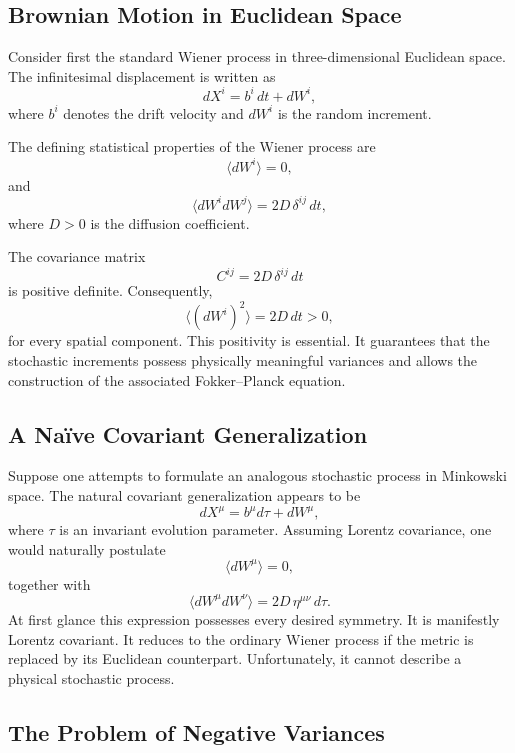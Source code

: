 \subsection{Brownian Motion in Euclidean Space}

Consider first the standard Wiener process in three-dimensional
Euclidean space.
The infinitesimal displacement is written as
\[dX^i=b^i\,dt+dW^i ,\]
where \(b^i\) denotes the drift velocity and \(dW^i\) is the random
increment.

The defining statistical properties of the Wiener process are
\[\langle dW^i\rangle =0,\]
and
\[\langle dW^i dW^j\rangle=2D\,\delta^{ij}\,dt ,\]
where \(D>0\) is the diffusion coefficient.

The covariance matrix
\[C^{ij}=2D\,\delta^{ij}\,dt\]
is positive definite.
Consequently,
\[\langle (dW^i)^2\rangle=2D\,dt>0,\]
for every spatial component.
This positivity is essential. It guarantees that the stochastic
increments possess physically meaningful variances and allows the
construction of the associated Fokker--Planck equation.

\subsection{A Na\"ive Covariant Generalization}

Suppose one attempts to formulate an analogous stochastic process in
Minkowski space.
The natural covariant generalization appears to be
\[dX^\mu=b^\mu d\tau+dW^\mu ,\]
where \(\tau\) is an invariant evolution parameter.
Assuming Lorentz covariance, one would naturally postulate
\[\langle dW^\mu\rangle =0,\]
together with
\[\boxed{\langle dW^\mu dW^\nu\rangle=2D\,\eta^{\mu\nu}\,d\tau .}\]
At first glance this expression possesses every desired symmetry.
It is manifestly Lorentz covariant.
It reduces to the ordinary Wiener process if the metric is replaced by
its Euclidean counterpart.
Unfortunately, it cannot describe a physical stochastic process.

\subsection{The Problem of Negative Variances}

